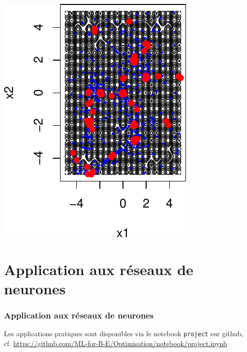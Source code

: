 \documentclass[12pt]{beamer}
\begin{document}
\begin{frame}
\begin{center}
{\begin{minipage}[t]{0.4\textwidth}
\includegraphics[width=\textwidth]{rastrigin_budget1000_restart10_x-crop.pdf}
\end{minipage}
}
\end{center}
\end{frame}


\section{Application aux réseaux de neurones}

\begin{frame}%
\frametitle{Application aux réseaux de neurones} 
\begin{center}
Les applications pratiques sont disponibles via le notebook \texttt{project} sur github,\\
cf. \url{https://github.com/ML-for-B-E/Optimisation/notebook/project.ipynb}
\end{center}
\end{frame}
\end{document}
